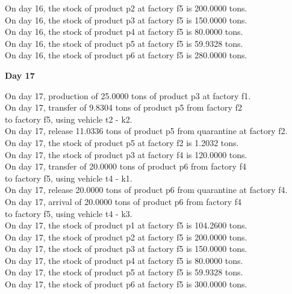 \begin{table}[H]
\begin{multicols}{2}
\begin{tabbing}
On day 16, the stock of product p2 at factory f5 is 200.0000 tons. \\
On day 16, the stock of product p3 at factory f5 is 150.0000 tons. \\
On day 16, the stock of product p4 at factory f5 is 80.0000 tons. \\
On day 16, the stock of product p5 at factory f5 is 59.9328 tons. \\
On day 16, the stock of product p6 at factory f5 is 280.0000 tons. \\
\end{tabbing} \vspace{-2.0em}
\textbf{Day 17}
\vspace{-1.6em}
\begin{tabbing}
On day 17, production of 25.0000 tons of product p3 at factory f1. \\
On day 17, transfer of 9.8304 tons of product p5 from factory f2 \\ to factory f5, using vehicle t2 - k2. \\
On day 17, release 11.0336 tons of product p5 from quarantine at factory f2. \\
On day 17, the stock of product p5 at factory f2 is 1.2032 tons. \\
On day 17, the stock of product p3 at factory f4 is 120.0000 tons. \\
On day 17, transfer of 20.0000 tons of product p6 from factory f4 \\ to factory f5, using vehicle t4 - k1. \\
On day 17, release 20.0000 tons of product p6 from quarantine at factory f4. \\
On day 17, arrival of 20.0000 tons of product p6 from factory f4 \\ to factory f5, using vehicle t4 - k3. \\
On day 17, the stock of product p1 at factory f5 is 104.2600 tons. \\
On day 17, the stock of product p2 at factory f5 is 200.0000 tons. \\
On day 17, the stock of product p3 at factory f5 is 150.0000 tons. \\
On day 17, the stock of product p4 at factory f5 is 80.0000 tons. \\
On day 17, the stock of product p5 at factory f5 is 59.9328 tons. \\
On day 17, the stock of product p6 at factory f5 is 300.0000 tons. \\
\end{tabbing} \vspace{-2.0em}

\end{multicols}
\end{table}
